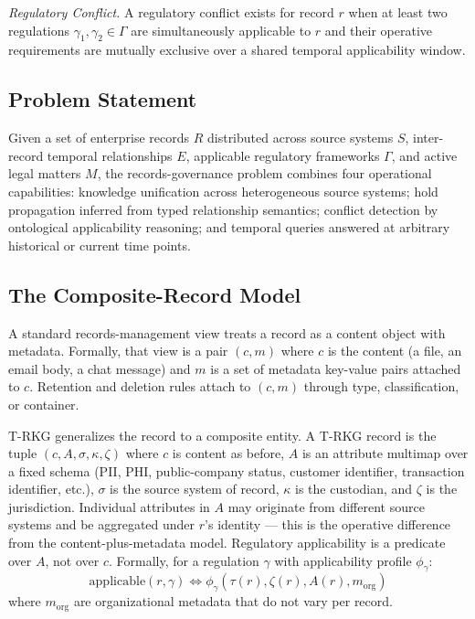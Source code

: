 \documentclass{ieeeaccess}
\begin{document}
\textit{Regulatory Conflict.} A regulatory conflict exists for record $r$ when at least two regulations $\gamma_1, \gamma_2 \in \Gamma$ are simultaneously applicable to $r$ and their operative requirements are mutually exclusive over a shared temporal applicability window.

\subsection{Problem Statement}

Given a set of enterprise records $R$ distributed across source systems $S$, inter-record temporal relationships $E$, applicable regulatory frameworks $\Gamma$, and active legal matters $M$, the records-governance problem combines four operational capabilities: knowledge unification across heterogeneous source systems; hold propagation inferred from typed relationship semantics; conflict detection by ontological applicability reasoning; and temporal queries answered at arbitrary historical or current time points.

\subsection{The Composite-Record Model}
\label{sec:composite}

A standard records-management view treats a record as a content object with metadata. Formally, that view is a pair $(c, m)$ where $c$ is the content (a file, an email body, a chat message) and $m$ is a set of metadata key-value pairs attached to $c$. Retention and deletion rules attach to $(c, m)$ through type, classification, or container.

T-RKG generalizes the record to a composite entity. A T-RKG record is the tuple $(c, A, \sigma, \kappa, \zeta)$ where $c$ is content as before, $A$ is an attribute multimap over a fixed schema (PII, PHI, public-company status, customer identifier, transaction identifier, etc.), $\sigma$ is the source system of record, $\kappa$ is the custodian, and $\zeta$ is the jurisdiction. Individual attributes in $A$ may originate from different source systems and be aggregated under $r$'s identity --- this is the operative difference from the content-plus-metadata model. Regulatory applicability is a predicate over $A$, not over $c$. Formally, for a regulation $\gamma$ with applicability profile $\phi_\gamma$:
\begin{equation}
    \mathrm{applicable}(r, \gamma) \iff \phi_\gamma(\tau(r), \zeta(r), A(r), m_{\mathrm{org}})
\end{equation}
where $m_{\mathrm{org}}$ are organizational metadata that do not vary per record.
\end{document}
